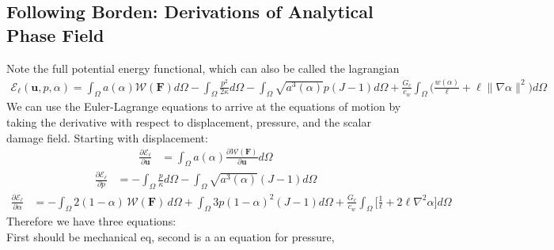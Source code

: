 \documentclass[12pt,3p]{article}
\numberwithin{equation}{section}
\begin{document}
\subsection{Following Borden: Derivations of Analytical Phase Field}
Note the full potential energy functional, which can also be called the lagrangian
\begin{align*}
\mathcal{E}_{\ell} (\boldsymbol{u}, p, \alpha) = \int_{\Omega} a(\alpha) \mathcal{W}(\mathbf{F}) d \Omega - \int_{\Omega} \frac{p^{2}}{2 \kappa} d \Omega - \int_{\Omega} \sqrt{a^{3}(\alpha)} p(J-1) d \Omega + \frac{G_{c}}{c_{w}} \int_{\Omega} \bigg(\frac{w(\alpha)}{\ell}+\ell\|\nabla \alpha\|^{2} \bigg) d \Omega
\end{align*}
We can use the Euler-Lagrange equations to arrive at the equations of motion by taking the derivative with respect to displacement, pressure, and the scalar damage field. Starting with displacement:
\begin{align*}
\frac{\partial \mathcal{E}_{\ell}}{\partial \boldsymbol{u}} &= \int_{\Omega} a (\alpha) \frac{\partial \mathcal{W} (\mathbf{F})}{\partial \mathbf{u}} d \Omega 
\end{align*}
\begin{align*}
\frac{\partial \mathcal{E}_{\ell}}{\partial p} &= - \int_{\Omega} \frac{p}{\kappa} d \Omega - \int_{\Omega} \sqrt{a^3(\alpha)} (J-1) d \Omega
\end{align*}
\begin{align*}
\frac{\partial \mathcal{E}_{\ell}}{\partial \alpha} &= - \int_{\Omega} 2 (1 - \alpha) \, \mathcal{W} (\mathbf{F}) \, d \Omega + \int_{\Omega} 3 p (1- \alpha)^2 (J-1) d \Omega + \frac{G_{c}}{c_{w}} \int_{\Omega} \bigg[ \frac{1}{\ell} + 2 \ell \nabla^2 \alpha \bigg] d \Omega 
\end{align*}
Therefore we have three equations: \\
First should be mechanical eq, second is a an equation for pressure, 
\end{document}

